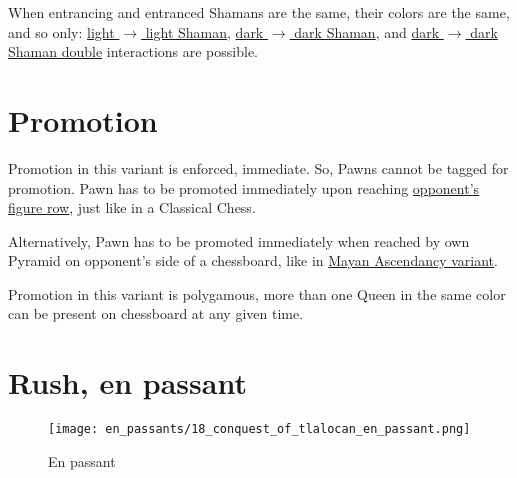 When entrancing and entranced Shamans are the same, their colors are the same, and so only: \newline
\hyperref[fig:scn_cot_18_light_light_shaman_interaction_start]{light $\rightarrow$ light Shaman}, \newline
\hyperref[fig:scn_cot_22_dark_dark_shaman_interaction_start]{dark $\rightarrow$ dark Shaman}, and \newline
\hyperref[fig:scn_cot_24_dark_dark_shaman_double_interaction_start]{dark $\rightarrow$ dark Shaman double}
interactions are possible.

\clearpage %

\section*{Promotion}
\label{sec:Conquest of Tlalocan/Promotion}

Promotion in this variant is enforced, immediate. So, Pawns cannot be tagged
for promotion. Pawn has to be promoted immediately upon reaching
\hyperref[fig:scn_aoa_14_pawn_figure_piece_rush_rows]{opponent's figure row},
just like in a Classical Chess.

Alternatively, Pawn has to be promoted immediately when reached by own Pyramid
on opponent's side of a chessboard, like in
\hyperref[sec:Mayan Ascendancy/Pyramid/Promotion]{Mayan Ascendancy variant}.

Promotion in this variant is polygamous, more than one Queen in the same color
can be present on chessboard at any given time.

\clearpage %

\section*{Rush, en passant}

\vspace*{-1.2\baselineskip}
\noindent
\begin{figure}[!h]
\texttt{[image: en\_passants/18\_conquest\_of\_tlalocan\_en\_passant.png]}
\caption{En passant}
\label{fig:18_conquest_of_tlalocan_en_passant}
\end{figure}

